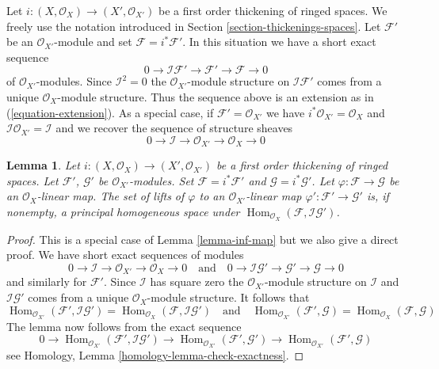 \documentclass{stacks-project}
\theoremstyle{plain}
\newtheorem{lemma}[subsection]{Lemma}
\theoremstyle{definition}
\theoremstyle{remark}
\numberwithin{equation}{subsection}
\def\Hom{\mathop{\mathrm{Hom}}\nolimits}
\begin{document}
\noindent
Let $i : (X, \mathcal{O}_X) \to (X', \mathcal{O}_{X'})$ be a first
order thickening of ringed spaces. We freely use the notation introduced in
Section \ref{section-thickenings-spaces}.
Let $\mathcal{F}'$ be an $\mathcal{O}_{X'}$-module
and set $\mathcal{F} = i^*\mathcal{F}'$.
In this situation we have a short exact sequence
$$
0 \to \mathcal{I}\mathcal{F}' \to \mathcal{F}' \to \mathcal{F} \to 0
$$
of $\mathcal{O}_{X'}$-modules. Since $\mathcal{I}^2 = 0$ the
$\mathcal{O}_{X'}$-module structure on $\mathcal{I}\mathcal{F}'$
comes from a unique $\mathcal{O}_X$-module structure.
Thus the sequence above is an extension as in (\ref{equation-extension}).
As a special case, if $\mathcal{F}' = \mathcal{O}_{X'}$ we have
$i^*\mathcal{O}_{X'} = \mathcal{O}_X$ and
$\mathcal{I}\mathcal{O}_{X'} = \mathcal{I}$ and we recover the
sequence of structure sheaves
$$
0 \to \mathcal{I} \to \mathcal{O}_{X'} \to \mathcal{O}_X \to 0
$$

\begin{lemma}
\label{lemma-inf-map-special}
Let $i : (X, \mathcal{O}_X) \to (X', \mathcal{O}_{X'})$
be a first order thickening of ringed spaces.
Let $\mathcal{F}'$, $\mathcal{G}'$ be $\mathcal{O}_{X'}$-modules.
Set $\mathcal{F} = i^*\mathcal{F}'$ and $\mathcal{G} = i^*\mathcal{G}'$.
Let $\varphi : \mathcal{F} \to \mathcal{G}$ be an $\mathcal{O}_X$-linear map.
The set of lifts of $\varphi$ to an $\mathcal{O}_{X'}$-linear map
$\varphi' : \mathcal{F}' \to \mathcal{G}'$ is, if nonempty, a principal
homogeneous space under
$\Hom_{\mathcal{O}_X}(\mathcal{F}, \mathcal{I}\mathcal{G}')$.
\end{lemma}

\begin{proof}
This is a special case of Lemma \ref{lemma-inf-map} but we also
give a direct proof. We have short exact sequences of modules
$$
0 \to \mathcal{I} \to \mathcal{O}_{X'} \to \mathcal{O}_X \to 0
\quad\text{and}\quad
0 \to \mathcal{I}\mathcal{G}' \to \mathcal{G}' \to \mathcal{G} \to 0
$$
and similarly for $\mathcal{F}'$.
Since $\mathcal{I}$ has square zero the $\mathcal{O}_{X'}$-module
structure on $\mathcal{I}$ and $\mathcal{I}\mathcal{G}'$ comes from
a unique $\mathcal{O}_X$-module structure. It follows that
$$
\Hom_{\mathcal{O}_{X'}}(\mathcal{F}', \mathcal{I}\mathcal{G}') =
\Hom_{\mathcal{O}_X}(\mathcal{F}, \mathcal{I}\mathcal{G}')
\quad\text{and}\quad
\Hom_{\mathcal{O}_{X'}}(\mathcal{F}', \mathcal{G}) =
\Hom_{\mathcal{O}_X}(\mathcal{F}, \mathcal{G})
$$
The lemma now follows from the exact sequence
$$
0 \to \Hom_{\mathcal{O}_{X'}}(\mathcal{F}', \mathcal{I}\mathcal{G}') \to
\Hom_{\mathcal{O}_{X'}}(\mathcal{F}', \mathcal{G}') \to
\Hom_{\mathcal{O}_{X'}}(\mathcal{F}', \mathcal{G})
$$
see Homology, Lemma \ref{homology-lemma-check-exactness}.
\end{proof}
\end{document}
